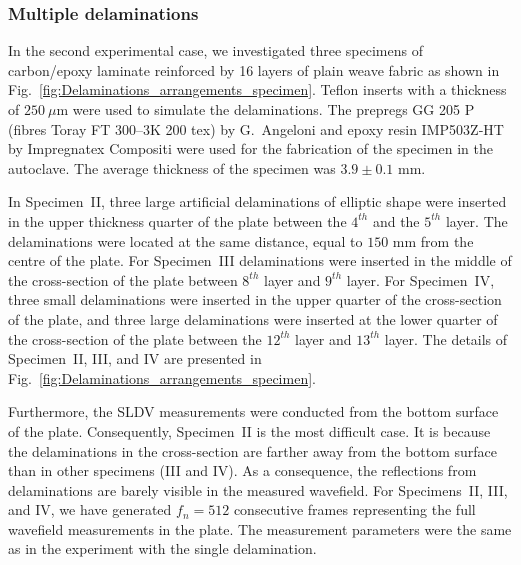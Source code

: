 \subsubsection{Multiple delaminations}
\label{sec5322}
In the second experimental case, we investigated three specimens of carbon/epoxy laminate reinforced by 16 layers of plain weave fabric as shown in Fig.~\ref{fig:Delaminations_arrangements_specimen}. 
Teflon inserts with a thickness of \(250\ \mu\)m were used to simulate the delaminations.
The prepregs GG 205 P (fibres Toray FT 300–3K 200 tex) by G.~Angeloni and epoxy resin IMP503Z‐HT by Impregnatex Compositi were used for the fabrication of the specimen in the autoclave. 
The average thickness of the specimen was \(3.9 \pm 0.1\) mm.

In Specimen~II, three large artificial delaminations of elliptic shape were inserted in the upper thickness quarter of the plate between the \(4^{th}\) and the \(5^{th}\) layer.
The delaminations were located at the same distance, equal to \(150\) mm from the centre of the plate.
For Specimen~III delaminations were inserted in the middle of the cross-section of the plate between \(8^{th}\) layer and \(9^{th}\) layer.
For Specimen~IV, three small delaminations were inserted in the upper quarter of the cross-section of the plate, and three large delaminations were inserted at the lower quarter of the cross-section of the plate between the \(12^{th}\) layer and \(13^{th}\) layer.
The details of Specimen~II, III, and IV are presented in Fig.~\ref{fig:Delaminations_arrangements_specimen}.

Furthermore, the SLDV measurements were conducted from the bottom surface of the plate. 
Consequently, Specimen~II is the most difficult case.
It is because the delaminations in the cross-section are farther away from the bottom surface than in other specimens (III and IV).
As a consequence, the reflections from delaminations are barely visible in the measured wavefield.
For Specimens~II, III, and IV, we have generated \(f_n=512\) consecutive frames representing the full wavefield measurements in the plate.
The measurement parameters were the same as in the experiment with the single delamination.

